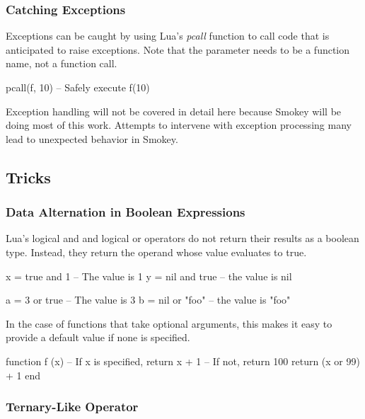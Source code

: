\documentclass[11pt]{article}
\newcommand{\func}[1]{\mbox{\itshape#1}}
\newcommand{\keyword}[1]{\mbox{\ttfamily#1}}
\begin{document}
\subsubsection{Catching Exceptions}

Exceptions can be caught by using Lua's \func{pcall} function to call code that is
anticipated to raise exceptions.  Note that the parameter needs to be a
function name, not a function call.

\begin{LuaCode}
pcall(f, 10) -- Safely execute f(10)
\end{LuaCode}

Exception handling will not be covered in detail here because Smokey will be
doing most of this work.  Attempts to intervene with exception processing many
lead to unexpected behavior in Smokey.

\subsection{Tricks}

\subsubsection{Data Alternation in Boolean Expressions}

Lua's logical \keyword{and} and logical \keyword{or} operators do not return their results as a
boolean type.  Instead, they return the operand whose value evaluates to true.

\begin{LuaCode}
x = true and 1   -- The value is 1
y = nil and true -- the value is nil
\end{LuaCode}

\begin{LuaCode}
a = 3 or true    -- The value is 3
b = nil or "foo" -- the value is "foo"
\end{LuaCode}

In the case of functions that take optional arguments, this makes it easy to
provide a default value if none is specified.

\begin{LuaCode}
function f (x)
	-- If x is specified, return x + 1
	-- If not, return 100
	return (x or 99) + 1
end
\end{LuaCode}

\subsubsection{Ternary-Like Operator}
\end{document}
